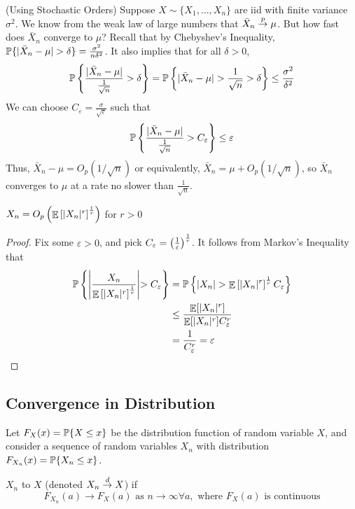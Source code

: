 \documentclass[10pt]{article}
\begin{document}
\begin{example}
	(Using Stochastic Orders) Suppose $X \sim \{X_1,\dots,X_n\}$ are iid with finite variance $\sigma^2$. We know from the weak law of large numbers that $\bar{X}_n \overset{p}{\to} \mu$. But how fast does $\bar{X}_n$ converge to $\mu$? Recall that by Chebyshev's Inequality, $\prob\{|\bar{X}_n - \mu|> \delta\} = \frac{\sigma^2}{n\delta^2}$. It also implies that for all $\delta > 0$,
	\[
	\mathbb{P}\left\{ \frac{|\bar{X}_n - \mu|}{\frac{1}{\sqrt{n}}} > \delta \right\} = \mathbb{P}\left\{ |\bar{X}_n - \mu| > \frac{1}{\sqrt{n}} > \delta \right\} \le \frac{\sigma^2}{\delta^2}
	\]
	We can choose $C_\varepsilon = \frac{\sigma}{\sqrt{\varepsilon}}$ such that 
	\[
	\mathbb{P}\left\{ \frac{|\bar{X}_n - \mu|}{\frac{1}{\sqrt{n}}} > C_\varepsilon \right\} \le \varepsilon
	\]
	Thus, $\bar{X}_n - \mu = O_p(1/\sqrt{n})$ or equivalently, $\bar{X}_n = \mu + O_p(1/\sqrt{n})$, so $\bar{X}_n$ converges to $\mu$ at a rate no slower than $\frac{1}{\sqrt{n}}$.
\end{example}

\begin{theorem}
	$X_n = O_p\left( \mathop{\mathbb{E}}\left[ |X_n|^r \right]^\frac{1}{r} \right)$ for $r > 0$
\end{theorem}
\begin{proof}
	Fix some $\varepsilon > 0$, and pick $C_\varepsilon = \left( \frac{1}{\varepsilon}\right)^\frac{1}{r}$. It follows from Markov's Inequality that
	\begin{align*}
	\mathbb{P} \left\{ \middle| \frac{X_n}{\mathop{\mathbb{E}}\left[ |X_n|^r \right]^\frac{1}{r}} \middle| > C_\varepsilon \right\} &= \mathbb{P}\left\{ |X_n| > \mathop{\mathbb{E}}\left[ |X_n|^r \right]^\frac{1}{r} C_\varepsilon\right\} \\
	&\le \frac{\mathop{\mathbb{E}}[ | X_n|^r]}{\mathop{\mathbb{E}}[ | X_n|^r] C_\varepsilon^r} \\
	&= \frac{1}{C_\varepsilon^r} = \varepsilon
	\end{align*}
\end{proof}

\subsection{Convergence in Distribution}

Let $F_X(x) = \mathbb{P}\{X \le x\}$ be the distribution function of random variable $X$, and consider a sequence of random variables $X_n$ with distribution $F_{X_n}(x) = \mathbb{P}\{X_n \le x\}$. 

\begin{definition}
	$X_n$  to $X$ (denoted $X_n \overset{d}{\to} X$) if
	\[
	F_{X_n}(a) \to F_X(a) \text{ as } n \to \infty \forall a, \text{ where } F_X(a) \text{ is continuous}
	\]
\end{definition}
\end{document}
